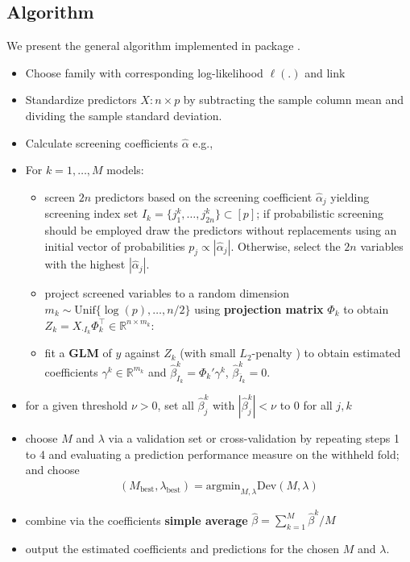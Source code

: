 \documentclass[
  article]{jss}
\begin{document}
\subsection{Algorithm}\label{sec-algo}

We present the general algorithm implemented in package .

\begin{itemize}
\item
  Choose family with corresponding log-likelihood \(\ell(.)\) and link
\item
  Standardize predictors \(X:n\times p\) by subtracting the sample
  column mean and dividing the sample standard deviation.
\item
  Calculate screening coefficients \(\hat\alpha\) e.g.,
\item
  For \(k=1,\dots,M\) models:

  \begin{itemize}
  \item
    screen \(2n\) predictors based on the screening coefficient
    \(\hat\alpha_j\) yielding screening index set
    \(I_k=\{j_1^k,\dots,j_{2n}^k\}\subset[p]\); if probabilistic
    screening should be employed draw the predictors without
    replacements using an initial vector of probabilities
    \(p_j\propto |\hat\alpha_j|\). Otherwise, select the \(2n\)
    variables with the highest \(|\hat\alpha_j|\).
  \item
    project screened variables to a random dimension
    \(m_k\sim \text{Unif}\{\log(p),\dots,n/2\}\) using
    \textbf{projection matrix} \(\Phi_k\) to obtain
    \(Z_k=X_{\cdot I_k}\Phi_k^\top \in \mathbb{R}^{n\times m_k}\):
  \item
    fit a \textbf{GLM} of \(y\) against \(Z_k\) (with small
    \(L_2\)-penalty \cite{glmnet2023}) to obtain estimated coefficients
    \(\gamma^k\in\mathbb{R}^{m_k}\) and
    \(\hat \beta_{I_k}^k=\Phi_k'\gamma^k\),
    \(\hat \beta_{\bar I_k}^k=0\).
  \end{itemize}
\item
  for a given threshold \(\nu>0\), set all \(\hat\beta_j^k\) with
  \(|\hat\beta_j^k|<\nu\) to \(0\) for all \(j,k\)
\item
  choose \(M\) and \(\lambda\) via a validation set or cross-validation
  by repeating steps 1 to 4 and evaluating a prediction performance
  measure on the withheld fold; and choose \begin{align}
       (M_{\text{best}},\lambda_{\text{best}}) = \text{argmin}_{M,\lambda}\text{Dev}(M,\lambda)
     \end{align}
\item
  combine via the coefficients \textbf{simple average}
  \(\hat \beta = \sum_{k=1}^M\hat \beta^k / M\)
\item
  output the estimated coefficients and predictions for the chosen \(M\)
  and \(\lambda\).
\end{itemize}
\end{document}
